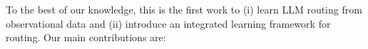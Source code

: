 \documentclass{article}
\theoremstyle{remark}
\begin{document}





To the best of our knowledge, this is the first work to (i) learn LLM routing from {observational data}  and (ii) introduce an integrated learning framework for routing. %
Our main contributions are:
\end{document}
